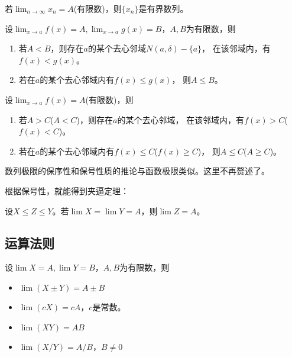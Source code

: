 \begin{theorem}[收敛数列的整体有界性]
  若$\lim_{n\to \infty}x_n=A$(有限数)，则$\{x_n\}$是有界数列。
\end{theorem}

\begin{theorem}[函数极限的保序性]
  设$\lim_{x\to a} f(x)=A,\lim_{x\to a} g(x)=B$，$A,B$为有限数，则
  \begin{enumerate}
    \item
    若$A<B$，则存在$a$的某个去心邻域$N(a,\delta)-\{a\}$，
    在该邻域内，有$f(x) < g(x)$。
    \item
    若在$a$的某个去心邻域内有$f(x) \le g(x)$，
    则$A\le B$。
  \end{enumerate}
\end{theorem}

\begin{corollary}[函数极限的保号性质]
  设$\lim_{x\to a} f(x)=A$(有限数)，则
  \begin{enumerate}
    \item
    若$A>C$($A<C$)，则存在$a$的某个去心邻域，
    在该邻域内，有$f(x)>C$($f(x)<C$)。
    \item
    若在$a$的某个去心邻域内有$f(x)\le C$($f(x)\ge C$)，
    则$A\le C$($A\ge C$)。
  \end{enumerate}
\end{corollary}

\begin{remark}
  数列极限的保序性和保号性质的推论与函数极限类似。这里不再赘述了。
\end{remark}

根据保号性，就能得到夹逼定理：
\begin{theorem}[夹逼定理] \label{thrm:squeeze}
  设$X\le Z\le Y$。若$\lim X = \lim Y = A$，则$\lim Z = A$。
\end{theorem}

\subsection{运算法则}
设$\lim X=A,\lim Y=B$，$A,B$为有限数，则
\begin{itemize}
  \item
  $\lim (X\pm Y) = A \pm B$
  \item
  $\lim (cX) = cA$，$c$是常数。
  \item
  $\lim (XY) = AB$
  \item
  $\lim (X/Y) = A/B$，$B\neq 0$
\end{itemize}

